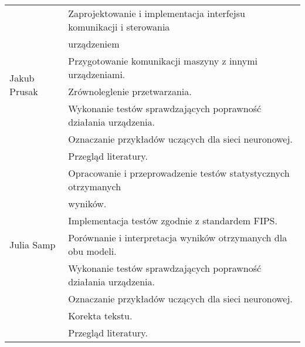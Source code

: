 \begin{table} [h]
\begin{tabular}{|l|l|}
        \multirow{7}{*}{Jakub Prusak} 
            & Zaprojektowanie i implementacja interfejsu komunikacji i sterowania \\
            & urządzeniem\\
            & Przygotowanie komunikacji maszyny z innymi urządzeniami. \\
            & Zrównoleglenie przetwarzania. \\
            & Wykonanie testów sprawdzających poprawność działania urządzenia. \\
            & Oznaczanie przykładów uczących dla sieci neuronowej. \\
            & Przegląd literatury. \\
        \hline
        \multirow{7}{*}{Julia Samp} 
            & Opracowanie i przeprowadzenie testów statystycznych otrzymanych \\
            & wyników. \\
            & Implementacja testów zgodnie z standardem FIPS. \\
            & Porównanie i interpretacja wyników otrzymanych dla obu modeli. \\
            & Wykonanie testów sprawdzających poprawność działania urządzenia. \\
            & Oznaczanie przykładów uczących dla sieci neuronowej. \\
            & Korekta tekstu. \\
            & Przegląd literatury. \\
        \hline  
    \end{tabular} 
\end{table}   
